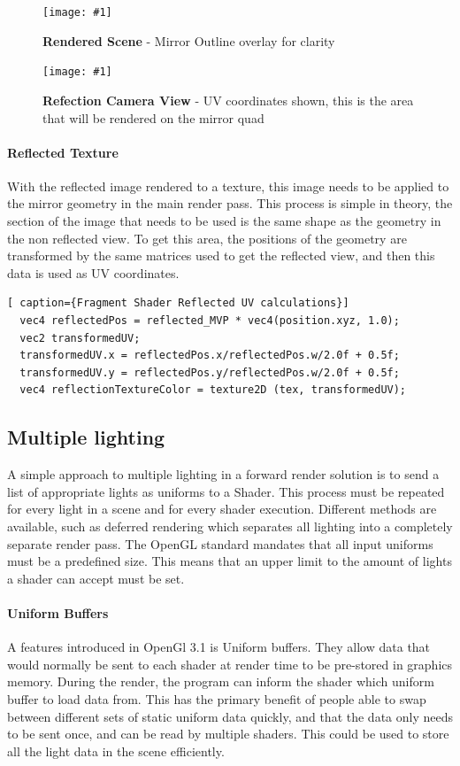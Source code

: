 \documentclass[conference]{acmsiggraph}
\newcommand{\figuremacroW}[4]{
	\begin{figure}[h] %
		\centering
		\texttt{[image: \#1]}
		\caption[#2]{\textbf{#2} - #3}
		\label{fig:#1}
	\end{figure}
}
\begin{document}
\figuremacroW
{front-Buffer}
{Rendered Scene}
{Mirror Outline overlay for clarity}
{1.0}

\figuremacroW
{ref-Buffer}
{Refection Camera View}
{UV coordinates shown, this is the area that will be rendered on the mirror quad}
{1.0}

\paragraph{Reflected Texture}
With the reflected image rendered to a texture, this image needs to be applied to the mirror geometry in the main render pass.
This process is simple in theory, the section of the image that needs to be used is the same shape as the geometry in the non reflected view.
To get this area, the positions of the geometry are transformed by the same matrices used to get the reflected view, and then this data is used as UV coordinates.

\begin{lstlisting}[ caption={Fragment Shader Reflected UV calculations}]
  vec4 reflectedPos = reflected_MVP * vec4(position.xyz, 1.0);
  vec2 transformedUV;
  transformedUV.x = reflectedPos.x/reflectedPos.w/2.0f + 0.5f;
  transformedUV.y = reflectedPos.y/reflectedPos.w/2.0f + 0.5f;
  vec4 reflectionTextureColor = texture2D (tex, transformedUV);
\end{lstlisting}

\subsection{Multiple lighting}
A simple approach to multiple lighting in a forward render solution is to send a list of appropriate lights as uniforms to a Shader.
This process must be repeated for every light in a scene and for every shader execution. Different methods are available, such as deferred rendering which separates all lighting into a completely separate render pass. The OpenGL standard mandates that all input uniforms must be a predefined size. This means that an upper limit to the amount of lights a shader can accept must be set.

\paragraph{Uniform Buffers}
A features introduced in OpenGl 3.1 is Uniform buffers. They allow data that would normally be sent to each shader at render time to be pre-stored in graphics memory. During the render, the program can inform the shader which uniform buffer to load data from. This has the primary benefit of people able to swap between different sets of static uniform data quickly, and that the data only needs to be sent once, and can be read by multiple shaders. This could be used to store all the light data in the scene efficiently.
\end{document}
